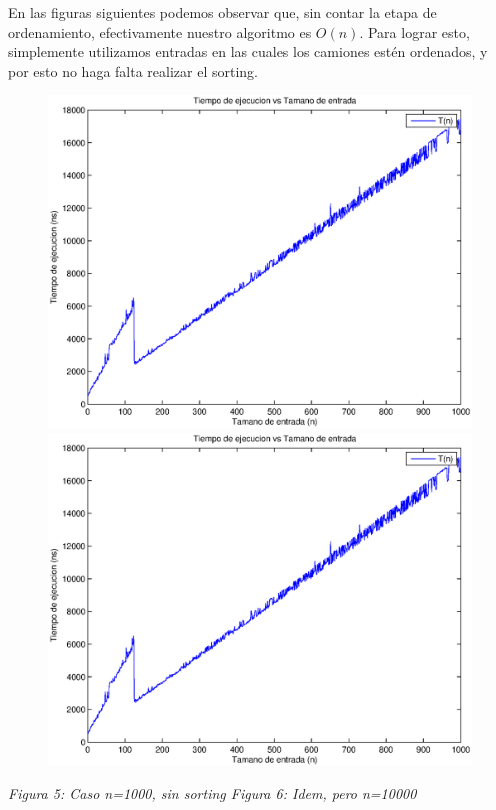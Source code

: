 En las figuras siguientes podemos observar que, sin contar la etapa de ordenamiento, efectivamente nuestro algoritmo es $O(n)$. Para lograr esto, simplemente utilizamos entradas en las cuales los camiones estén ordenados, y por esto no haga falta realizar el sorting.

\begin{figure}[H]
    \includegraphics[width=0.5\linewidth]{problema1/graficos/problema1_aleatoria_1000.eps}
    \includegraphics[width=0.5\linewidth]{problema1/graficos/problema1_aleatoria_1000.eps}
\end{figure}
\emph{\hspace{2cm}Figura 5: Caso n=1000, sin sorting \hspace{2,5cm}Figura 6: Idem, pero n=10000}
